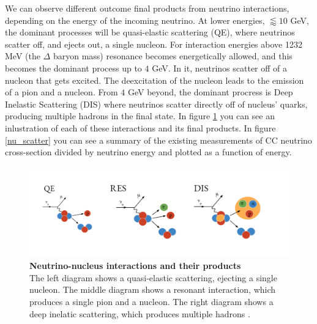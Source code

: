 %
We can observe different outcome final products from neutrino interactions, depending on the energy of the incoming neutrino. At lower energies, $\lessapprox 10$ GeV, the dominant processes will be quasi-elastic scattering (QE), where neutrinos scatter off, and ejects out, a single nucleon. For interaction energies above 1232 MeV (the $\Delta$ baryon mass) resonance becomes energetically allowed, and this becomes the dominant process up to $4$ GeV. In it, neutrinos scatter off of a nucleon that gets excited. The deexcitation of the nucleon leads to the emission of a pion and a nucleon. From $4$ GeV beyond, the dominant procress is Deep Inelastic Scattering (DIS) where neutrinos scatter directly off of nucleus' quarks, producing multiple hadrons in the final state. In figure \ref{nu_nucleus_int} you can see an inlustration of each of these interactions and its final products. In figure \ref{nu_scatter} you can see a summary of the existing measurements of CC neutrino cross-section divided by neutrino energy and plotted as a function of energy. 
%
\begin{figure}[h!]
	\begin{center}
		\includegraphics[scale=0.15]{Figures/neutrino_int_processes.jpeg}
		\caption[Neutrino-nucleus interactions and their products]{ {\textbf{Neutrino-nucleus interactions and their products}} \\ The left diagram shows a quasi-elastic scattering, ejecting a single nucleon. The middle diagram shows a resonant interaction, which produces a single pion and a nucleon. The right diagram shows a deep inelatic scattering, which produces multiple hadrons \cite{afro_phd}.}
		\label{nu_nucleus_int}	
	\end{center}
\end{figure}
%
